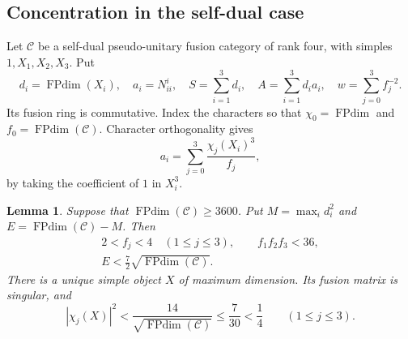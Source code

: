 \documentclass[11pt]{amsart}
\newtheorem{lemma}[theorem]{Lemma}
\theoremstyle{definition}
\DeclareMathOperator{\FPdim}{FPdim}
\numberwithin{equation}{section}
\begin{document}
\subsection{Concentration in the self-dual case}\label{sec:concentration}
Let $\mathcal C$ be a self-dual pseudo-unitary fusion category of rank four,
with simples $1,X_1,X_2,X_3$. Put
\[
 d_i=\FPdim(X_i),\quad a_i=N_{ii}^{i},\quad
 S=\sum_{i=1}^3d_i,\quad A=\sum_{i=1}^3d_i a_i,\quad
 w=\sum_{j=0}^3f_j^{-2}.
\]
Its fusion ring is commutative. Index the characters so that
$\chi_0=\FPdim$ and $f_0=\FPdim(\mathcal C)$.
Character orthogonality gives
\begin{equation}\label{eq:short-character-identities}
 a_i=\sum_{j=0}^3\frac{\chi_j(X_i)^3}{f_j},
\end{equation}
by taking the coefficient of $1$ in $X_i^3$.

\begin{lemma}\label{lem:short-concentration}
Suppose that $\FPdim(\mathcal C)\geq3600$. Put
$M=\max_i d_i^2$ and $E=\FPdim(\mathcal C)-M$. Then
\begin{gather}
 2<f_j<4\quad(1\leq j\leq3),\qquad f_1f_2f_3<36,
       \label{eq:short-codegrees}\\
 E<\frac72\sqrt{\FPdim(\mathcal C)}.
       \label{eq:short-dominance}
\end{gather}
There is a unique simple object $X$ of maximum dimension. Its fusion
matrix is singular, and
\begin{equation}\label{eq:short-small-eigenvalues}
 |\chi_j(X)|^2<\frac{14}{\sqrt{\FPdim(\mathcal C)}}
 \leq\frac7{30}<\frac14
 \qquad(1\leq j\leq3).
\end{equation}
\end{lemma}
\end{document}
